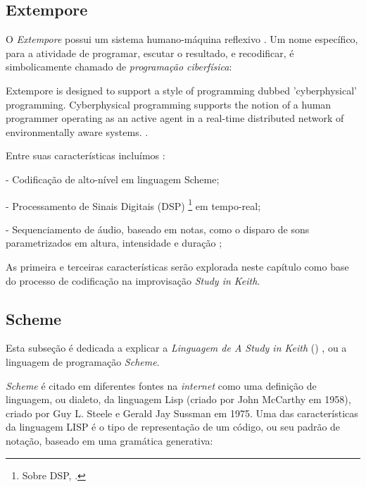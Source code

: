 \subsection{Extempore}

O \emph{Extempore} possui um sistema humano-máquina reflexivo . Um nome específico, para a atividade de programar, escutar o resultado, e recodificar, é simbolicamente chamado de \emph{programação ciberfísica}:

\begin{citacao}
 {Extempore is designed to support a style of programming dubbed 'cyberphysical' programming. Cyberphysical programming supports the notion of a human programmer operating as an active agent in a real-time distributed network of environmentally aware systems. . }
\end{citacao}

Entre suas características incluímos :

- Codificação  de alto-nível em linguagem Scheme;

- Processamento de Sinais Digitais (DSP) \footnote{Sobre DSP, .} em  tempo-real;

- Sequenciamento de áudio, baseado em notas, como o disparo de sons parametrizados em altura, intensidade e duração ;

As primeira e terceiras características serão explorada neste capítulo como base do processo de codificação na improvisação \emph{Study in Keith}.

\subsection{Scheme}\label{sec:scheme}

Esta subseção é dedicada a explicar a \emph{Linguagem de A Study in Keith} () , ou a linguagem de programação \emph{Scheme}.

\emph{Scheme} é citado em diferentes fontes na \emph{internet} como uma definição de linguagem, ou dialeto, da linguagem Lisp (criado por John McCarthy em 1958), criado por Guy L. Steele e Gerald Jay Sussman em 1975. Uma das características da linguagem LISP é o tipo de representação de um código, ou seu padrão de notação, baseado em uma gramática generativa:


